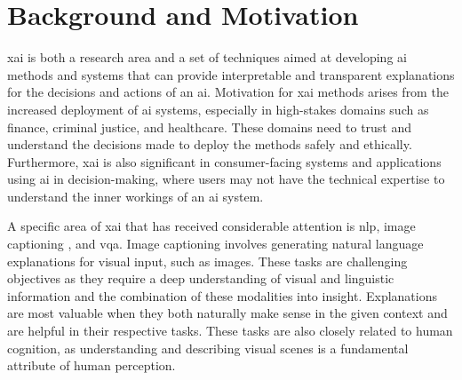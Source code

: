 \label{sec:1_1_background_and_motivation}

\begin{comment}
In about a page, summarize the most important background information. The text usually leads to YOUR PROBLEM STATEMENT (in the next section) and gives arguments about why this is a challenge today.
\end{comment}

\section{Background and Motivation}

\gls{xai} is both a research area and a set of techniques aimed at developing \gls{ai} methods and systems that can provide interpretable and transparent explanations for the decisions and actions of an \gls{ai}. Motivation for \gls{xai} methods arises from the increased deployment of \gls{ai} systems, especially in high-stakes domains such as finance, criminal justice, and healthcare. These domains need to trust and understand the decisions made to deploy the methods safely and ethically. Furthermore, \gls{xai} is also significant in consumer-facing systems and applications using \gls{ai} in decision-making, where users may not have the technical expertise to understand the inner workings of an \gls{ai} system.

A specific area of \gls{xai} that has received considerable attention is \gls{nlp}, image captioning \cite{vinyalsShowTellNeural2015, youImageCaptioningSemantic2016, vinyalsShowTellLessons2017}, and \gls{vqa}. Image captioning involves generating natural language explanations for visual input, such as images.
These tasks are challenging objectives as they require a deep understanding of visual and linguistic information and the combination of these modalities into insight. Explanations are most valuable when they both naturally make sense in the given context and are helpful in their respective tasks. These tasks are also closely related to human cognition, as understanding and describing visual scenes is a fundamental attribute of human perception. 

